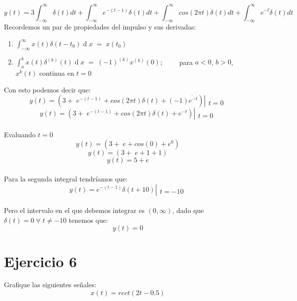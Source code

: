 \documentclass[10pt,a4paper]{report}
\begin{document}
\[
y(t)=3\int_{-\infty }^{\infty }\delta (t)dt+\int_{-\infty }^{\infty }e^{-(t-1)}\delta (t)dt+\int_{-\infty }^{\infty }cos(2\pi t)\dot{\delta}(t)dt+\int_{-\infty }^{\infty }e^{-t}\ddot{\delta}(t)dt
\]
Recordemos un par de propiedades del impulso y sus derivadas:
\begin{enumerate}
  \item $\int_{-\infty}^\infty x\left(t\right)\delta\left(t-t_0\right)\operatorname dx\;=\;x\left(t_0\right)$
  \item $\int_a^bx\left(t\right)\delta^{\left(k\right)}\left(t\right)\operatorname dx\;=\;\left(-1\right)^{\left(k\right)}x^{\left(k\right)}\left(0\right); \qquad$ para $a<0$, $b>0$, $x^k\left(t\right)$ continua en $t=0$
\end{enumerate}
Con esto podemos decir que:\\
\[ y\left(t\right) = \left(3+\;e^{-\left(t-1\right)}+cos\left(2\pi t\right)\delta\left(t\right)+\left(-1\right)\dot{e^{-t}}\right)\left|\begin{array}{l}\\t=0\end{array}\right. \]
\[ y\left(t\right) = \left(3+\;e^{-\left(t-1\right)}+cos\left(2\pi t\right)\delta\left(t\right)+{e^{-t}}\right)\left|\begin{array}{l}\\t=0\end{array}\right. \]\\
Evaluando $t=0$
\[ y\left(t\right) = \left(3+\;e+cos\left(0\right)+e^0\right) \]
\[ y\left(t\right) = \left(3+\;e+1+1\right) \]
\[ y\left(t\right) = 5+e \]\\
Para la segunda integral tendríamos que:
\[ y\left(t\right)= e^{-\left(t-1\right)}\delta\left(t+10\right)\left|\begin{array}{l}\\t=-10\end{array}\right. \]\\
Pero el intervalo en el que debemos integrar es $\left(0,\infty\right)$, dado que $\delta\left(t\right) = 0 \; \forall \; t \neq -10$ tenemos que:
\[ y\left(t\right)= 0 \]




\section{Ejercicio 6}
Grafique las siguientes señales:
\begin{equation*}
x(t)=rect(2t-0.5)
\end{equation*}
\end{document}
